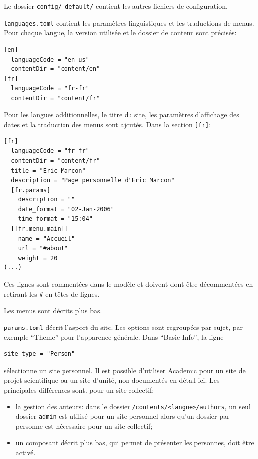 \documentclass[
  12pt,
  french,
  a4paper,
  extrafontsizes,onecolumn,openright
  ]{memoir}
\providecommand{\tightlist}{%
  \setlength{\itemsep}{0pt}\setlength{\parskip}{0pt}}
\begin{document}
Le dossier \texttt{config/\_default/} contient les autres fichiers de configuration.

\texttt{languages.toml} contient les paramètres linguistiques et les traductions de menus.
Pour chaque langue, la version utilisée et le dossier de contenu sont précisés:

\begin{verbatim}
[en]
  languageCode = "en-us"
  contentDir = "content/en"
[fr]
  languageCode = "fr-fr"
  contentDir = "content/fr"
\end{verbatim}

Pour les langues additionnelles, le titre du site, les paramètres d'affichage des dates et la traduction des menus sont ajoutés.
Dans la section \texttt{{[}fr{]}}:

\begin{verbatim}
[fr]
  languageCode = "fr-fr"
  contentDir = "content/fr"
  title = "Eric Marcon"
  description = "Page personnelle d'Eric Marcon"
  [fr.params]
    description = ""
    date_format = "02-Jan-2006"
    time_format = "15:04"
  [[fr.menu.main]]
    name = "Accueil"
    url = "#about"
    weight = 20
(...)
\end{verbatim}

Ces lignes sont commentées dans le modèle et doivent dont être décommentées en retirant les \texttt{\#} en têtes de lignes.

Les menus sont décrits plus bas.

\texttt{params.toml} décrit l'aspect du site.
Les options sont regroupées par sujet, par exemple \enquote{Theme} pour l'apparence générale.
Dans \enquote{Basic Info}, la ligne

\begin{verbatim}
site_type = "Person"
\end{verbatim}

sélectionne un site personnel.
Il est possible d'utiliser Academic pour un site de projet scientifique ou un site d'unité, non documentés en détail ici.
Les principales différences sont, pour un site collectif:

\begin{itemize}
\tightlist
\item
  la gestion des auteurs: dans le dossier \texttt{/contents/\textless{}langue\textgreater{}/authors}, un seul dossier \texttt{admin} est utilisé pour un site personnel alors qu'un dossier par personne est nécessaire pour un site collectif;
\item
  un composant décrit plus bas, qui permet de présenter les personnes, doit être activé.
\end{itemize}
\end{document}
